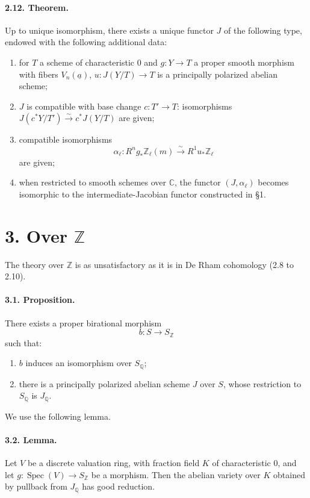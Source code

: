 \documentclass[10pt]{article}
\newcommand{\C}{\mathbb C}
\newcommand{\Q}{\mathbb Q}
\newcommand{\Z}{\mathbb Z}
\newcommand{\Spec}{\operatorname{Spec}}
\newcommand{\iso}{\xrightarrow{\sim}}
\begin{document}
\paragraph{2.12. Theorem.} Up to unique isomorphism, there exists a unique functor \(J\) of the following type, endowed with the following additional data:
\begin{enumerate}[label=\alph*)]
\item for \(T\) a scheme of characteristic \(0\) and \(g:Y\to T\) a proper smooth morphism with fibers \(V_n(\underline a)\), \(u:J(Y/T)\to T\) is a principally polarized abelian scheme;
\item \(J\) is compatible with base change \(c:T'\to T\): isomorphisms \(J(c^*Y/T')\iso c^*J(Y/T)\) are given;
\item compatible isomorphisms
\[
\alpha_\ell:R^ng_*\Z_\ell(m)\iso R^1u_*\Z_\ell
\]
are given;
\item when restricted to smooth schemes over \(\C\), the functor \((J,\alpha_\ell)\) becomes isomorphic to the intermediate-Jacobian functor constructed in §1.
\end{enumerate}

\section*{3. Over \(\Z\)}

The theory over \(\Z\) is as unsatisfactory as it is in De Rham cohomology (2.8 to 2.10).

\paragraph{3.1. Proposition.} There exists a proper birational morphism
\[
b:S\longrightarrow S_\Z
\]
such that:
\begin{enumerate}[label=\alph*)]
\item \(b\) induces an isomorphism over \(S_\Q\);
\item there is a principally polarized abelian scheme \(J\) over \(S\), whose restriction to \(S_\Q\) is \(J_\Q\).
\end{enumerate}

We use the following lemma.

\paragraph{3.2. Lemma.} Let \(V\) be a discrete valuation ring, with fraction field \(K\) of characteristic \(0\), and let \(g:\Spec(V)\to S_\Z\) be a morphism. Then the abelian variety over \(K\) obtained by pullback from \(J_\Q\) has good reduction.
\end{document}
